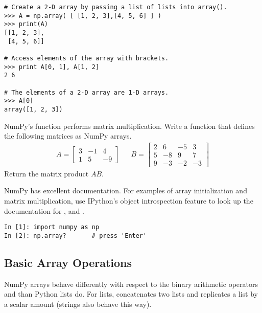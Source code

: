 \begin{lstlisting}
# Create a 2-D array by passing a list of lists into array().
>>> A = np.array( [ [1, 2, 3],[4, 5, 6] ] )
>>> print(A)
[[1, 2, 3],
 [4, 5, 6]]

# Access elements of the array with brackets.
>>> print A[0, 1], A[1, 2]
2 6

# The elements of a 2-D array are 1-D arrays.
>>> A[0]
array([1, 2, 3])
\end{lstlisting}

\begin{problem} %
NumPy's  function performs matrix multiplication. %
Write a function that defines the following matrices as NumPy arrays.
\begin{align*}
A = \left[\begin{array}{rrr}
3 & -1 &  4 \\
1 &  5 & -9 \end{array}\right]
&&
B = \left[\begin{array}{cccc}
2 &  6 & -5 &  3\\
5 & -8 &  9 &  7\\
9 & -3 & -2 & -3\end{array}\right]
\end{align*}
Return the matrix product $AB$.

NumPy has excellent documentation.
For examples of array initialization and matrix multiplication, use IPython's object introspection feature to look up the documentation for ,  and .
\begin{lstlisting}
In [1]: import numpy as np
In [2]: np.array?       # press 'Enter'
\end{lstlisting}
\label{prob:simple1}
\end{problem}

\subsection*{Basic Array Operations} %

NumPy arrays behave differently with respect to the binary arithmetic operators \li{+} and \li{*} than Python lists do.
For lists, \li{+} concatenates two lists and \li{*} replicates a list by a scalar amount (strings also behave this way).

